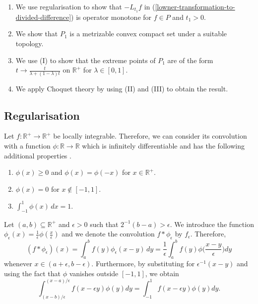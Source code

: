 \documentclass[12pt,a4paper]{amsart}
\theoremstyle{definition}
\begin{document}
	\begin{enumerate}[label=\textnormal{(\Roman*)}]
		\item We use regularisation to show that  $-L_{t_1}f$ in (\ref{lowner-transformation-to-divided-difference}) is operator monotone for $f \in P$ and  $t_1 > 0$.
		\item We show that  $P_1$ is a metrizable convex compact set under a suitable topology.
		\item We use (I)  to show that the extreme points of $P_1$ are of the form $t \rightarrow \frac{t}{\lambda + (1- \lambda)t}$ on $\mathbb{R}^{+}$ for $\lambda \in [0, 1]$.
		\item We apply Choquet theory by using (II) and (III) to obtain the result.
	\end{enumerate}
	
	
	\subsection{Regularisation}
	 Let $f: \mathbb{R}^{+} \rightarrow \mathbb{R}^{+}$ be locally integrable. Therefore, we can consider its convolution with a function $\phi: \mathbb{R} \rightarrow \mathbb{R}$ which is infinitely differentiable and has the following additional properties \cite[Page 11]{donoghue}.
	\begin{enumerate}[label=\textnormal{(\Roman*)}]
		\item $\phi(x) \geq 0$ and $\phi(x) = \phi(-x)$ for $x \in \mathbb{R}^{+}$.
		\item  $\phi(x) = 0$ for $x \notin [-1, 1]$.
		\item $\int_{-1}^{1} \phi(x) \,  d x = 1$.
	\end{enumerate}
	
	Let $(a, b) \subseteq \mathbb{R}^{+}$ and $\epsilon > 0$ such that $2^{-1}(b-a) > \epsilon$. We introduce the function $\phi_{\epsilon}(x) = \frac{1}{\epsilon} \phi(\frac{x}{\epsilon})$ and we denote the convolution $f \ast \phi_{\epsilon}$ by $f_{\epsilon}$. Therefore, 
	\begin{equation}\label{regularisation-equation}
		(f \ast \phi_{\epsilon})(x) = \int^{b}_{a} f(y) \phi_{\epsilon}(x-y) \, dy  = \frac{1}{\epsilon} \int^{b}_{a} f(y)  \phi \bigg(  \frac{x-y}{\epsilon} \bigg) dy
	\end{equation}
	whenever $x \in (a + \epsilon, b - \epsilon)$. Furthermore, by substituting for $\epsilon^{-1}(x-y)$ and using the fact that $\phi$ vanishes outside $[-1, 1]$, we obtain 
	\begin{equation*}
		\int^{(x-a)/\epsilon}_{(x-b) /\epsilon} f(x- \epsilon y) \phi(y) dy = \int^{1}_{-1} f(x- \epsilon y) \phi(y) dy.
	\end{equation*}
	
\end{document}
